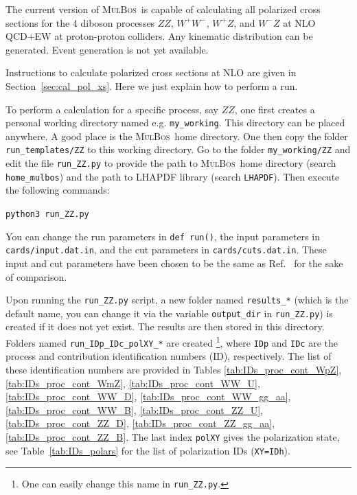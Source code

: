 \documentclass[english,12pt]{article}
\newcommand{\mulbos}{\textsc{MulBos}}
\newcommand{\sect}[1]{Section~\ref{#1}}
\newcommand{\tab}[1]{Table~\ref{#1}}
\newcommand{\bib}[1]{Ref.~\cite{#1}}
\begin{document}
The current version of \mulbos\ is capable of calculating all polarized cross sections 
for the 4 diboson processes $ZZ$, $W^+W^-$, $W^+Z$, and $W^-Z$ at NLO QCD+EW at proton-proton colliders. 
Any kinematic distribution can be generated. Event generation is not yet available.

Instructions to calculate polarized cross sections at NLO are given in \sect{sec:cal_pol_xs}. 
Here we just explain how to perform a run. 

To perform a calculation for a specific process, say $ZZ$, one first creates a personal working directory 
named e.g. {\tt my\_working}. This directory can be placed anywhere. A good place is the \mulbos\ home directory.
One then copy the folder {\tt run\_templates/ZZ} to this working directory.
Go to the folder {\tt my\_working/ZZ} and edit the file {\tt run\_ZZ.py} to
provide the path to \mulbos\ home directory (search {\tt home\_mulbos}) 
and the path to LHAPDF library (search {\tt LHAPDF}). Then execute the following commands:
\begin{center}
{\tt python3 run\_ZZ.py}
\end{center}
You can change the run parameters in {\tt def run()}, the input parameters in\\ 
{\tt cards/input.dat.in}, 
and the cut parameters in {\tt cards/cuts.dat.in}. 
These input and cut parameters have been chosen to be the same as \bib{Carrivale:2025mjy} for the sake of comparison.

Upon running the {\tt run\_ZZ.py} script, a new folder named {\tt results\_*} (which is the default name, you can change it via 
the variable {\tt output\_dir} in {\tt run\_ZZ.py}) is created if 
it does not yet exist. The results are then 
stored in this directory. Folders named {\tt run\_IDp\_IDc\_polXY\_*} are created \footnote{One can easily change this name in {\tt run\_ZZ.py}.}, 
where {\tt IDp} and {\tt IDc} are the process and contribution identification numbers (ID), respectively.  
The list of these identification numbers are provided in Tables \ref{tab:IDs_proc_cont_WpZ}, 
\ref{tab:IDs_proc_cont_WmZ}, \ref{tab:IDs_proc_cont_WW_U}, \ref{tab:IDs_proc_cont_WW_D}, 
\ref{tab:IDs_proc_cont_WW_gg_aa}, \ref{tab:IDs_proc_cont_WW_B}, 
\ref{tab:IDs_proc_cont_ZZ_U}, \ref{tab:IDs_proc_cont_ZZ_D}, 
\ref{tab:IDs_proc_cont_ZZ_gg_aa}, \ref{tab:IDs_proc_cont_ZZ_B}. 
The last index {\tt polXY} gives the polarization state, see \tab{tab:IDs_polars} for the list of 
polarization IDs ({\tt XY=IDh}). 
\end{document}
